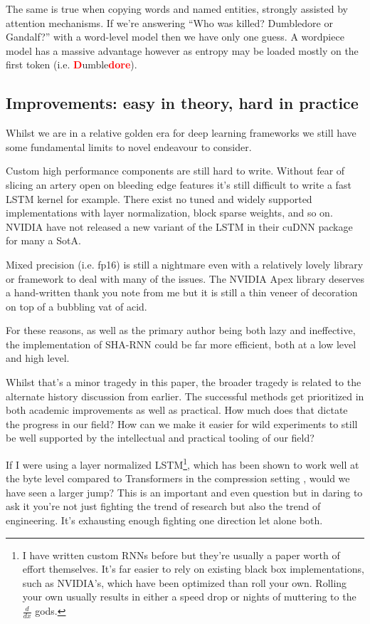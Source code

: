 \documentclass{article}
\begin{document}
The same is true when copying words and named entities, strongly assisted by attention mechanisms.
If we're answering ``Who was killed? Dumbledore or Gandalf?'' with a word-level model then we have only one guess.
A wordpiece model has a massive advantage however as entropy may be loaded mostly on the first token (i.e.
\textbf{\textcolor{red}{D}}umble\textbf{\textcolor{red}{dore}}).

\subsection{Improvements: easy in theory, hard in practice}

Whilst we are in a relative golden era for deep learning frameworks we still have some fundamental limits to novel endeavour to consider.

Custom high performance components are still hard to write.
Without fear of slicing an artery open on bleeding edge features it's still difficult to write a fast LSTM kernel for example.
There exist no tuned and widely supported implementations with layer normalization, block sparse weights, and so on.
NVIDIA have not released a new variant of the LSTM in their cuDNN package for many a SotA.

Mixed precision (i.e. fp16) is still a nightmare even with a relatively lovely library or framework to deal with many of the issues.
The NVIDIA Apex library deserves a hand-written thank you note from me but it is still a thin veneer of decoration on top of a bubbling vat of acid.

For these reasons, as well as the primary author being both lazy and ineffective, the implementation of SHA-RNN could be far more efficient, both at a low level and high level.

Whilst that's a minor tragedy in this paper, the broader tragedy is related to the alternate history discussion from earlier.
The successful methods get prioritized in both academic improvements as well as practical.
How much does that dictate the progress in our field?
How can we make it easier for wild experiments to still be well supported by the intellectual and practical tooling of our field?

If I were using a layer normalized LSTM\footnote{I have written custom RNNs before but they're usually a paper worth of effort themselves. It's far easier to rely on existing black box implementations, such as NVIDIA's, which have been optimized than roll your own. Rolling your own usually results in either a speed drop or nights of muttering to the $\frac{d}{dx}$ gods.}, which has been shown to work well at the byte level compared to Transformers in the compression setting \cite{bellard2019lossless}, would we have seen a larger jump?
This is an important and even question but in daring to ask it you're not just fighting the trend of research but also the trend of engineering.
It's exhausting enough fighting one direction let alone both.
\end{document}
